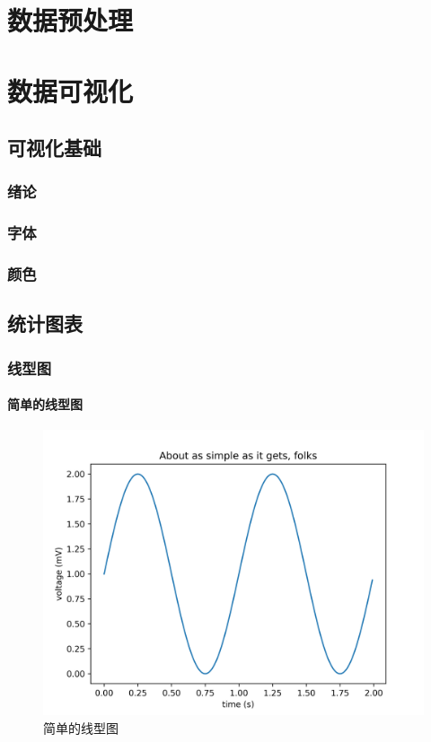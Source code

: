 \documentclass[openany]{progbookcn}
\begin{document}
\part{数据预处理}
\part{数据可视化}
\chapter{可视化基础}
\section{绪论}
\section{字体}
\section{颜色}
\chapter{统计图表}
\section{线型图}
\subsection{简单的线型图}

\begin{figure}[H]
\centering
\includegraphics[width=0.6 \textwidth]{figs/chapter9/lines/SimpleLine}
\caption{简单的线型图}
\end{figure}
\end{document}

